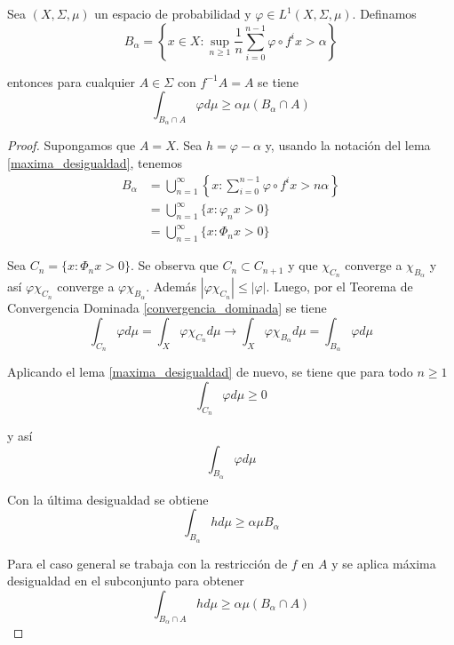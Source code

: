\begin{lema}\label{maxima_desigualdad_cor}
	Sea $(X,\Sigma,\mu)$ un espacio de probabilidad y $\varphi \in L^1(X,\Sigma,\mu)$. Definamos	
	\begin{equation}
		B_{\alpha} = \left\{ x \in X: \sup_{n \geq 1} \frac{1}{n} \sum_{i=0}^{n-1} \varphi \circ f^i x > \alpha \right\}
	\end{equation}
	
	entonces para cualquier $A \in \Sigma$ con $f^{-1}A=A$ se tiene	
	\begin{equation}
		\int_{B_{\alpha} \cap A} \varphi d\mu \geq \alpha \mu(B_{\alpha} \cap A)
	\end{equation}
\end{lema}

\begin{proof}
	Supongamos que $A=X$. Sea $h = \varphi - \alpha$ y, usando la notación del lema \ref{maxima_desigualdad}, tenemos
	\begin{align}
		B_{\alpha} &= \bigcup_{n=1}^{\infty} \left\{ x: \sum_{i=0}^{n-1} \varphi \circ f^i x > n \alpha \right\}\\
		&= \bigcup_{n=1}^{\infty} \{ x: \varphi_n x > 0 \}\\
		&= \bigcup_{n=1}^{\infty} \{ x: \varPhi_n x > 0 \}
	\end{align}
	
	Sea $C_n = \{ x: \varPhi_n x > 0 \}$. Se observa que $C_n \subset C_{n+1}$ y que $\chi_{C_n}$ converge a $\chi_{B_{\alpha}}$ y así $\varphi \chi_{C_n}$ converge a $\varphi \chi_{B_{\alpha}}$. Además $|\varphi \chi_{C_n}| \leq |\varphi|$. Luego, por el Teorema de Convergencia Dominada \ref{convergencia_dominada} se tiene
	\begin{equation}
		\int_{C_n} \varphi d\mu = \int_X \varphi \chi_{C_n} d\mu \rightarrow \int_X \varphi \chi_{B_{\alpha}} d\mu = \int_{B_{\alpha}} \varphi d\mu 
	\end{equation}
	
	Aplicando el lema \ref{maxima_desigualdad} de nuevo, se tiene que para todo $n \geq 1$
	\begin{equation}
		\int_{C_n} \varphi d\mu \geq 0
	\end{equation}
	
	y así
	\begin{equation}
		\int_{B_{\alpha}} \varphi d\mu
	\end{equation}
	
	Con la última desigualdad se obtiene
	\begin{equation}
		\int_{B_{\alpha}} h d\mu \geq \alpha \mu B_{\alpha}
	\end{equation}
	
	Para el caso general se trabaja con la restricción de $f$ en $A$ y se aplica máxima desigualdad en el subconjunto para obtener
	\begin{equation}
		\int_{B_{\alpha} \cap A} h d\mu \geq \alpha \mu(B_{\alpha} \cap A)
	\end{equation}
\end{proof}

